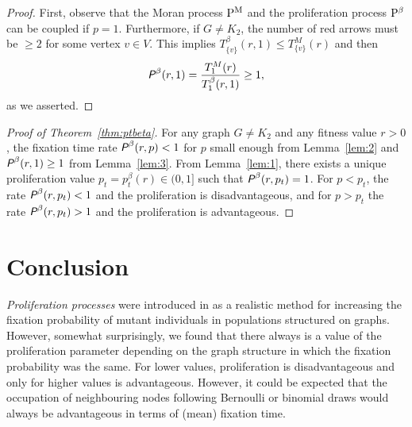 \documentclass[a4paper,english,10pt]{amsart}
\newcommand{\Rho}{\emph{\textsf{P\hspace{0.1ex}}}}
\newcommand{\Proc}{\rm P}
\theoremstyle{definition}
\numberwithin{equation}{section}
\begin{document}
\begin{proof} First, observe that the Moran process $\Proc^M$ and the proliferation process $\Proc^\beta$ can be coupled if $p = 1$. Furthermore, if $G \neq K_2$, the number of red arrows must be $\geq 2$ for some vertex $v \in V$.
This implies 
$T^\beta_{\{v\}} (r,1) \leq T^M_{\{v\}}(r)$
and 
then
$$
\Rho^\beta(r,1) = \frac{T^M_1(r)}{T^\beta_1(r,1)} \geq 1, 
$$
as we asserted. 
\end{proof}

\begin{proof}[Proof of Theorem~\ref{thm:ptbeta}] For any graph $G \neq K_2$ and any fitness value $r > 0$, the fixation time rate 
$\Rho^\beta(r,p) < 1$ for 
$p$ small enough from Lemma~\ref{lem:2} and $\Rho^\beta(r,1) \geq  1$ from Lemma~\ref{lem:3}. From Lemma~\ref{lem:1}, there exists a unique proliferation value $p_t = p^\beta_t(r) \in (0,1]$ such that 
$\Rho^\beta(r,p_t) = 1$. For $p < p_t$, the rate $\Rho^\beta(r,p_t) < 1$ and the proliferation is disadvantageous, and for $p > p_t$ the rate $\Rho^\beta(r,p_t) > 1$ and the proliferation is advantageous.
\end{proof}


\section{Conclusion}

\emph{Proliferation processes} were introduced in \cite{AlcaldeGuerberoffLozano2022} as a realistic method for increasing the fixation probability of mutant individuals in populations structured on graphs. However, somewhat surprisingly, we found that there always is a value of the proliferation parameter depending on the graph structure in which the fixation probability was the same. For lower values, proliferation is disadvantageous and only for higher values is advantageous. However, it could be expected that the occupation of neighbouring nodes following Bernoulli or binomial draws would always be advantageous in terms of (mean) fixation time. 
\end{document}
